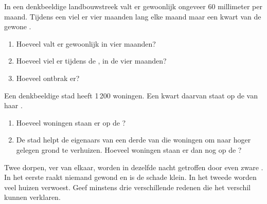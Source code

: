 \begin{exercise}[$\star\star$]\label{exo:g5:natural-hazards:9}
In een denkbeeldige landbouwstreek valt er gewoonlijk ongeveer
60 millimeter  per maand. Tijdens een  viel er vier maanden
lang elke maand maar een kwart van de gewone .
\begin{enumerate}
  \item[(a)] Hoeveel  valt er gewoonlijk in vier maanden?
  \item[(b)] Hoeveel viel er tijdens de , in de vier maanden?
  \item[(c)] Hoeveel  ontbrak er?
\end{enumerate}
\end{exercise}

\begin{exercise}[$\star\star$]\label{exo:g5:natural-hazards:10}
Een denkbeeldige stad heeft 1\,200 woningen. Een kwart daarvan staat op de
 van haar .
\begin{enumerate}
  \item[(a)] Hoeveel woningen staan er op de ?
  \item[(b)] De stad helpt de eigenaars van een derde van die woningen om
        naar hoger gelegen grond te verhuizen. Hoeveel woningen staan er
        dan nog op de ?
\end{enumerate}
\end{exercise}

\begin{exercise}[$\star\star\star$]\label{exo:g5:natural-hazards:11}
Twee dorpen, ver van elkaar, worden in dezelfde nacht getroffen door even
zware . In het eerste raakt niemand gewond en is de schade klein. In
het tweede worden veel huizen verwoest. Geef minstens drie verschillende
redenen die het verschil kunnen verklaren.
\end{exercise}
